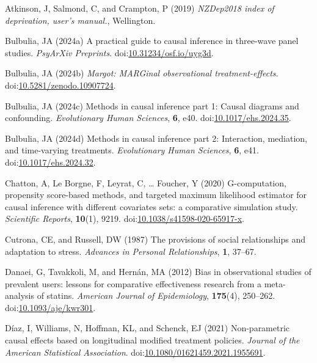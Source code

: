 \documentclass[
  single column]{article}
\newlength{\cslhangindent}
\newenvironment{CSLReferences}[2] %
 {\begin{list}{}{%
  \setlength{\itemindent}{0pt}
  \setlength{\leftmargin}{0pt}
  \setlength{\parsep}{0pt}
  \ifodd #1
   \setlength{\leftmargin}{\cslhangindent}
   \setlength{\itemindent}{-1\cslhangindent}
  \fi
  \setlength{\itemsep}{#2\baselineskip}}}
 {\end{list}}
\begin{document}
\label{refs}
\begin{CSLReferences}{1}{0}
Atkinson, J, Salmond, C, and Crampton, P (2019) \emph{NZDep2018 index of
deprivation, user{'}s manual.}, Wellington.

Bulbulia, JA (2024a) A practical guide to causal inference in three-wave
panel studies. \emph{PsyArXiv Preprints}.
doi:\href{https://doi.org/10.31234/osf.io/uyg3d}{10.31234/osf.io/uyg3d}.

Bulbulia, JA (2024b) \emph{Margot: MARGinal observational
treatment-effects}.
doi:\href{https://doi.org/10.5281/zenodo.10907724}{10.5281/zenodo.10907724}.

Bulbulia, JA (2024c) Methods in causal inference part 1: Causal diagrams
and confounding. \emph{Evolutionary Human Sciences}, \textbf{6}, e40.
doi:\href{https://doi.org/10.1017/ehs.2024.35}{10.1017/ehs.2024.35}.

Bulbulia, JA (2024d) Methods in causal inference part 2: Interaction,
mediation, and time-varying treatments. \emph{Evolutionary Human
Sciences}, \textbf{6}, e41.
doi:\href{https://doi.org/10.1017/ehs.2024.32}{10.1017/ehs.2024.32}.

Chatton, A, Le Borgne, F, Leyrat, C, \ldots{} Foucher, Y (2020)
G-computation, propensity score-based methods, and targeted maximum
likelihood estimator for causal inference with different covariates
sets: a comparative simulation study. \emph{Scientific Reports},
\textbf{10}(1), 9219.
doi:\href{https://doi.org/10.1038/s41598-020-65917-x}{10.1038/s41598-020-65917-x}.

Cutrona, CE, and Russell, DW (1987) The provisions of social
relationships and adaptation to stress. \emph{Advances in Personal
Relationships}, \textbf{1}, 37--67.

Danaei, G, Tavakkoli, M, and Hernán, MA (2012) Bias in observational
studies of prevalent users: lessons for comparative effectiveness
research from a meta-analysis of statins. \emph{American Journal of
Epidemiology}, \textbf{175}(4), 250--262.
doi:\href{https://doi.org/10.1093/aje/kwr301}{10.1093/aje/kwr301}.

Díaz, I, Williams, N, Hoffman, KL, and Schenck, EJ (2021) Non-parametric
causal effects based on longitudinal modified treatment policies.
\emph{Journal of the American Statistical Association}.
doi:\href{https://doi.org/10.1080/01621459.2021.1955691}{10.1080/01621459.2021.1955691}.


\end{CSLReferences}
\end{document}
